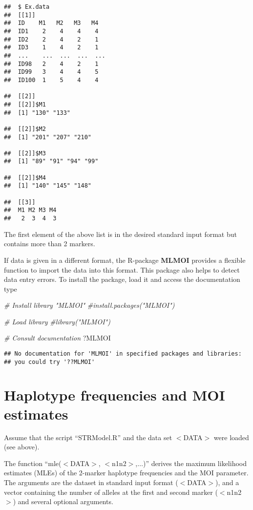 \documentclass[
]{article}
\newenvironment{Shaded}{\begin{snugshade}}{\end{snugshade}}
\newcommand{\CommentTok}[1]{\textcolor[rgb]{0.56,0.35,0.01}{\textit{#1}}}
\newcommand{\NormalTok}[1]{#1}
\begin{document}
\begin{verbatim}
##  $ Ex.data
##  [[1]]
##  ID    M1   M2   M3   M4
##  ID1    2    4    4    4
##  ID2    2    4    2    1
##  ID3    1    4    2    1
##  ...    ...  ...  ...  ...
##  ID98   2    4    2    1
##  ID99   3    4    4    5
##  ID100  1    5    4    4

##  [[2]]
##  [[2]]$M1
##  [1] "130" "133"

##  [[2]]$M2
##  [1] "201" "207" "210"

##  [[2]]$M3
##  [1] "89" "91" "94" "99"

##  [[2]]$M4
##  [1] "140" "145" "148"

##  [[3]]
##  M1 M2 M3 M4
##   2  3  4  3
\end{verbatim}

The first element of the above list is in the desired standard input
format but contains more than 2 markers.

If data is given in a different format, the R-package \textbf{MLMOI}
provides a flexible function to import the data into this format. This
package also helps to detect data entry errors. To install the package,
load it and access the documentation type

\begin{Shaded}
\begin{Highlighting}[]
\CommentTok{\# Install library "MLMOI"}
\CommentTok{\#install.packages("MLMOI")}

\CommentTok{\# Load library}
\CommentTok{\#library("MLMOI")}

\CommentTok{\# Consult documentation}
\NormalTok{?MLMOI}
\end{Highlighting}
\end{Shaded}

\begin{verbatim}
## No documentation for 'MLMOI' in specified packages and libraries:
## you could try '??MLMOI'
\end{verbatim}

\section*{Haplotype frequencies and MOI estimates}

Assume that the script ``STRModel.R'' and the data set \(<\)DATA\(>\)
were loaded (see above).

The function ``mle(\(<\)DATA\(>\), \(<\)n1n2\(>\),\(\ldots\))'' derives
the maximum likelihood estimates (MLEs) of the 2-marker haplotype
frequencies and the MOI parameter. The arguments are the dataset in
standard input format (\(<\)DATA\(>\)), and a vector containing the
number of alleles at the first and second marker (\(<\)n1n2\(>\)) and
several optional arguments.
\end{document}
